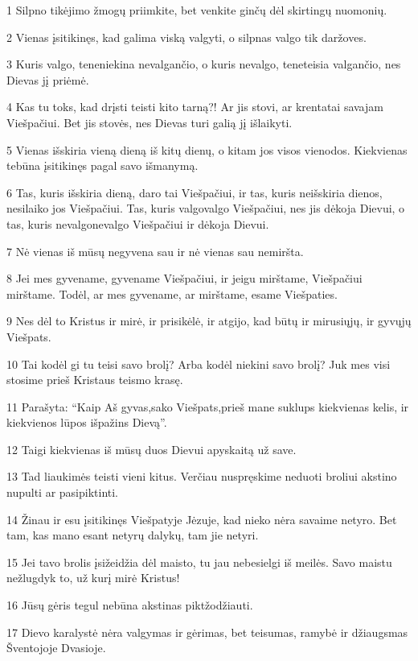 \par 1 Silpno tikėjimo žmogų priimkite, bet venkite ginčų dėl skirtingų nuomonių. 
\par 2 Vienas įsitikinęs, kad galima viską valgyti, o silpnas valgo tik daržoves. 
\par 3 Kuris valgo, teneniekina nevalgančio, o kuris nevalgo, teneteisia valgančio, nes Dievas jį priėmė. 
\par 4 Kas tu toks, kad drįsti teisti kito tarną?! Ar jis stovi, ar krenta­tai savajam Viešpačiui. Bet jis stovės, nes Dievas turi galią jį išlaikyti. 
\par 5 Vienas išskiria vieną dieną iš kitų dienų, o kitam jos visos vienodos. Kiekvienas tebūna įsitikinęs pagal savo išmanymą. 
\par 6 Tas, kuris išskiria dieną, daro tai Viešpačiui, ir tas, kuris neišskiria dienos, nesilaiko jos Viešpačiui. Tas, kuris valgo­valgo Viešpačiui, nes jis dėkoja Dievui, o tas, kuris nevalgo­nevalgo Viešpačiui ir dėkoja Dievui. 
\par 7 Nė vienas iš mūsų negyvena sau ir nė vienas sau nemiršta. 
\par 8 Jei mes gyvename, gyvename Viešpačiui, ir jeigu mirštame, Viešpačiui mirštame. Todėl, ar mes gyvename, ar mirštame,­ esame Viešpaties. 
\par 9 Nes dėl to Kristus ir mirė, ir prisikėlė, ir atgijo, kad būtų ir mirusiųjų, ir gyvųjų Viešpats. 
\par 10 Tai kodėl gi tu teisi savo brolį? Arba kodėl niekini savo brolį? Juk mes visi stosime prieš Kristaus teismo krasę. 
\par 11 Parašyta: “Kaip Aš gyvas,­sako Viešpats,­prieš mane suklups kiekvienas kelis, ir kiekvienos lūpos išpažins Dievą”. 
\par 12 Taigi kiekvienas iš mūsų duos Dievui apyskaitą už save. 
\par 13 Tad liaukimės teisti vieni kitus. Verčiau nuspręskime neduoti broliui akstino nupulti ar pasipiktinti. 
\par 14 Žinau ir esu įsitikinęs Viešpatyje Jėzuje, kad nieko nėra savaime netyro. Bet tam, kas mano esant netyrų dalykų, tam jie netyri. 
\par 15 Jei tavo brolis įsižeidžia dėl maisto, tu jau nebesielgi iš meilės. Savo maistu nežlugdyk to, už kurį mirė Kristus! 
\par 16 Jūsų gėris tegul nebūna akstinas piktžodžiauti. 
\par 17 Dievo karalystė nėra valgymas ir gėrimas, bet teisumas, ramybė ir džiaugsmas Šventojoje Dvasioje. 
